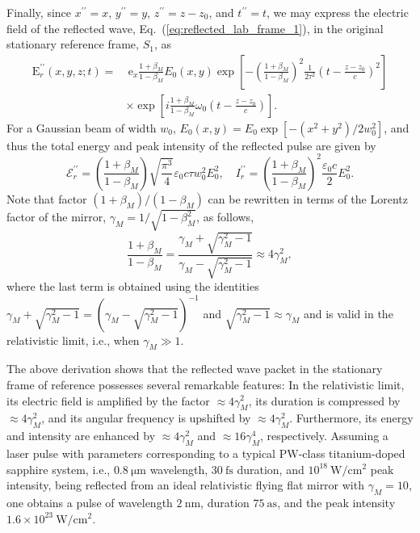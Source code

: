 \documentclass[10pt, a4paper, twoside, openright]{report}
\renewcommand{\vec}[1]{\boldsymbol{\mathrm{#1}}}
\begin{document}
Finally, since $ x^{\prime \prime} = x $, $ y^{\prime \prime} = y $, $ z^{\prime \prime} = z - z_0 $, and $ t^{\prime \prime} = t $, we may express the electric field of the reflected wave, Eq.~(\ref{eq:reflected_lab_frame_1}), in the original stationary reference frame, $ S_1 $, as
\begin{equation}\label{eq:reflected_lab_frame_2}
\begin{split}
\vec{E}^{\prime \prime}_r \left(x, y, z; t \right) = & \ \vec{e}_x \frac{1 + \beta_M}{1 - \beta_M} E_0 \left(x, y \right) \exp \left[ - \left(\frac{1 + \beta_M}{1 - \beta_M}\right)^2 \frac{1}{2 \tau^2} \left(t - \frac{z - z_0}{c}\right)^2 \right] \\ 
& \times \exp \left[ i \frac{1 + \beta_M}{1 - \beta_M} \omega_0 \left(t - \frac{z - z_0}{c}\right) \right].
\end{split}
\end{equation}
For a Gaussian beam of width $ w_0 $, $ E_0 \left( x, y \right) = E_0 \exp \left[-\left( x^2 + y^2 \right) / 2 w_0^2 \right] $, and thus the total energy and peak intensity of the reflected pulse are given by 
\begin{equation}\label{eq:energy_and_intensity}
\mathcal{E}^{\prime \prime}_r = \left(\frac{1 + \beta_M}{1 - \beta_M}\right) \sqrt{\frac{\pi^3}{4}} \varepsilon_0 c \tau w_0^2 E_0^2 , \quad I^{\prime \prime}_r = \left(\frac{1 + \beta_M}{1 - \beta_M}\right)^2 \frac{\varepsilon_0 c}{2} E_0^2.
\end{equation}
Note that factor $ \left(1 + \beta_M \right) / \left(1 - \beta_M \right) $ can be rewritten in terms of the Lorentz factor of the mirror, $ \gamma_M = 1 / \sqrt{1 - \beta_M^2} $, as follows,
\begin{equation}\label{eq:factor}
\frac{1 + \beta_M}{1 - \beta_M} = \frac{\gamma_M + \sqrt{\gamma_M^2 - 1}}{\gamma_M - \sqrt{\gamma_M^2 - 1}} \approx 4 \gamma_M^2,
\end{equation}
where the last term is obtained using the identities $ \gamma_M + \sqrt{\gamma_M^2 - 1} = ( \gamma_M - \sqrt{\gamma_M^2 - 1} )^{-1} $ and $ \sqrt{\gamma_M^2 - 1} \approx \gamma_M $ and is valid in the relativistic limit, i.e., when $ \gamma_M \gg 1 $.

The above derivation shows that the reflected wave packet in the stationary frame of reference possesses several remarkable features: In the relativistic limit, its electric field is amplified by the factor $ \approx 4 \gamma_M^2 $, its duration is compressed by $ \approx 4 \gamma_M^2 $, and its angular frequency is upshifted by $ \approx 4 \gamma_M^2 $. Furthermore, its energy and intensity are enhanced by $ \approx 4 \gamma_M^2 $ and $ \approx 16 \gamma_M^4 $, respectively. Assuming a laser pulse with parameters corresponding to a typical $ \mathrm{PW} $-class titanium-doped sapphire system, i.e., $ 0.8 \ \mathrm{\mu m} $ wavelength, $ 30 \ \mathrm{fs} $ duration, and $ 10^{18} \ \mathrm{W / cm^2} $ peak intensity, being reflected from an ideal relativistic flying flat mirror with $ \gamma_M = 10 $, one obtains a pulse of wavelength $ 2 \ \mathrm{nm} $, duration $ 75 \ \mathrm{as} $, and the peak intensity $ 1.6 \times 10^{23} \ \mathrm{W / cm^2} $.
\end{document}
